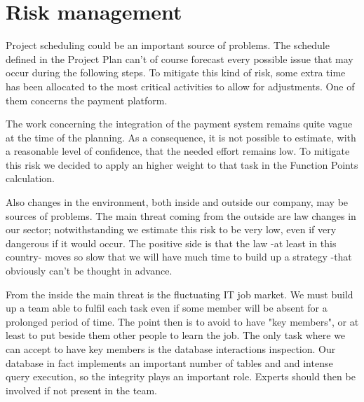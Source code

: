 \chapter{Risk management}

Project scheduling could be an important source of problems. The schedule defined in the Project Plan can't of course forecast every possible issue that may occur during the following steps. To mitigate this kind of risk, some extra time has been allocated to the most critical activities to allow for adjustments. One of them concerns the payment platform.
 
The work concerning the integration of the payment system remains quite vague at the time of the planning. As a consequence, it is not possible to estimate, with a reasonable level of confidence, that the needed effort remains low. To mitigate this risk we decided to apply an higher weight to that task in the Function Points calculation.
 
Also changes in the environment, both inside and outside our company, may be sources of problems. The main threat coming from the outside are law changes in our sector; notwithstanding we estimate this risk to be very low, even if very dangerous if it would occur. The positive side is that the law -at least in this country- moves so slow that we will have much time to build up a strategy -that obviously can't be thought in advance.
 
From the inside the main threat is the fluctuating IT job market. We must build up a team able to fulfil each task even if some member will be absent for a prolonged period of time. The point then is to avoid to have "key members", or at least to put beside them other people to learn the job. The only task where we can accept to have key members is the database interactions inspection.  Our database in fact implements an important number of tables and and intense query execution, so the integrity plays an important role. Experts should then be involved if not present in the team.
